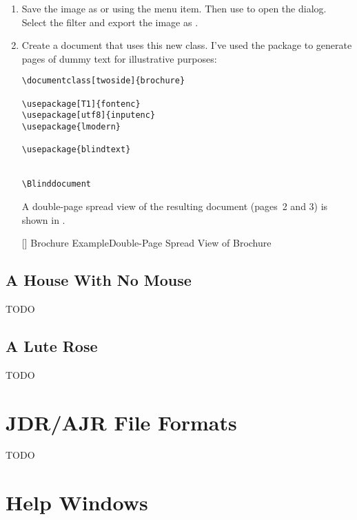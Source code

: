 \begin{enumerate}
[]
{}
{Brochure Example\dash All Pages View Again (All Frames Shown in their
Odd Page Position)}

\item Save the image as  or
 using the  menu
item. Then use  to open the
 dialog. Select the
 filter and export the image as
.

\item Create a document that uses this new class. I've used the
 package to generate pages of dummy text for
illustrative purposes:
\begin{verbatim}
\documentclass[twoside]{brochure}

\usepackage[T1]{fontenc}
\usepackage[utf8]{inputenc}
\usepackage{lmodern}

\usepackage{blindtext}


\Blinddocument

\end{verbatim}

A double-page spread view of the resulting document (pages~2 and 3)
is shown in .

[]
{}
{Brochure Example\dash Double-Page Spread View of Brochure}

\end{enumerate}

\section{A House With No Mouse}\label{sec:accesstutorial}

TODO


\section{A Lute Rose}\label{sec:rosetutorial}

TODO


\chapter{JDR/AJR File Formats}\label{sec:jdrajrformat}

TODO


\chapter{Help Windows}
\label{sec:helpwindows}

